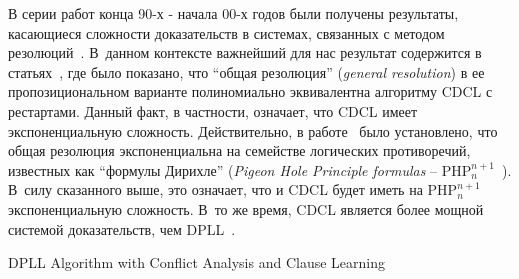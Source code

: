 В серии работ конца 90-х \-- начала 00-х годов были получены результаты, касающиеся сложности доказательств в системах, связанных с методом резолюций~\cite{robinson1966}.
В~данном контексте важнейший для нас результат содержится в статьях~\cite{beame2003,beame2004}, где было показано, что \enquote{общая резолюция} (\textit{general resolution}) в ее пропозициональном варианте полиномиально эквивалентна алгоритму CDCL с рестартами.
Данный факт, в частности, означает, что CDCL имеет экспоненциальную сложность.
Действительно, в работе~\cite{haken1985} было установлено, что общая резолюция экспоненциальна на семействе логических противоречий, известных как \enquote{формулы Дирихле} (\textit{Pigeon Hole Principle formulas} \--- $\mathrm{PHP}_{n}^{n + 1}$~\cite{ben-sasson2004}).
В~силу сказанного выше, это означает, что и CDCL будет иметь на $\mathrm{PHP}_{n}^{n + 1}$ экспоненциальную сложность.
В~то же время, CDCL является более мощной системой доказательств, чем DPLL~\cite{beame2003,beame2004,ben-sasson2004}.




\begin{algorithm}[H]
    \caption{DPLL Algorithm with Conflict Analysis and Clause Learning}
    \DontPrintSemicolon


\end{algorithm}


